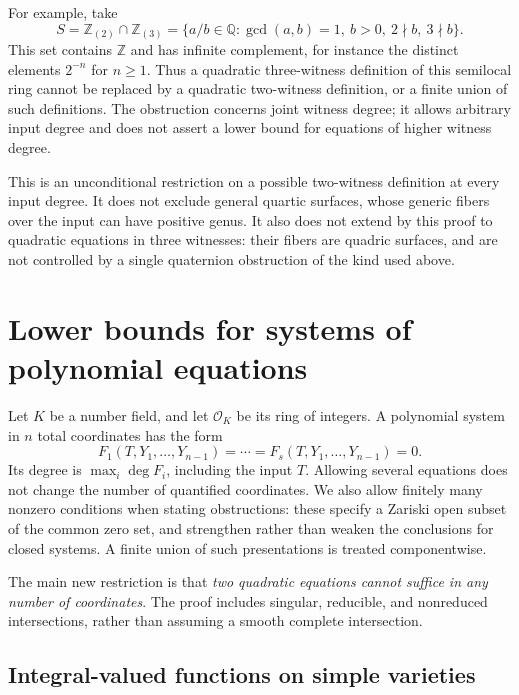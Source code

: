 \documentclass[11pt]{article}
\theoremstyle{definition}
\begin{document}
For example, take
\[
 S=\mathbb Z_{(2)}\cap\mathbb Z_{(3)}
   =\{a/b\in\mathbb Q:\gcd(a,b)=1,\ b>0,\ 2\nmid b,\ 3\nmid b\}.
\]
This set contains $\mathbb Z$ and has infinite complement, for instance
the distinct elements $2^{-n}$ for $n\ge1$.  Thus a quadratic
three-witness definition of this semilocal ring cannot be replaced by a
quadratic two-witness definition, or a finite union of such definitions.
The obstruction concerns joint witness degree; it allows arbitrary input
degree and does not assert a lower bound for equations of higher witness
degree.

This is an unconditional restriction on a possible two-witness
definition at every input degree.  It does not exclude general quartic
surfaces, whose generic fibers over the input can have positive genus.
It also does not extend by this proof to quadratic equations in three
witnesses: their fibers are quadric surfaces, and are not controlled by
a single quaternion obstruction of the kind used above.


\section{Lower bounds for systems of polynomial equations}
\label{p3sys:lower-bounds}

Let $K$ be a number field, and let $\mathcal O_K$ be its ring of
integers.  A polynomial system in $n$ total coordinates has the form
\[
 F_1(T,Y_1,\ldots,Y_{n-1})=\cdots
   =F_s(T,Y_1,\ldots,Y_{n-1})=0.
\]
Its degree is $\max_i\deg F_i$, including the input $T$.
Allowing several equations does not change the number of quantified
coordinates.  We also allow finitely many nonzero conditions when
stating obstructions: these specify a Zariski open subset of the common
zero set, and strengthen rather than weaken the conclusions for closed
systems.  A finite union of such presentations is treated componentwise.

The main new restriction is that \emph{two quadratic equations cannot
suffice in any number of coordinates}.  The proof includes singular,
reducible, and nonreduced intersections, rather than assuming a smooth
complete intersection.

\subsection{Integral-valued functions on simple varieties}
\end{document}
